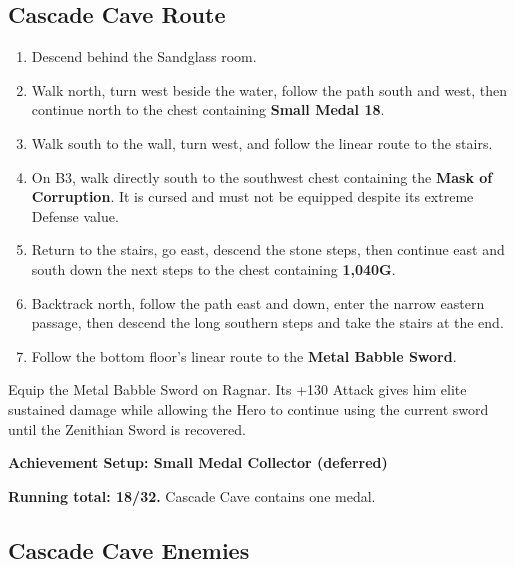 \documentclass[
  american,
  10pt,
  letterpaper,
  oneside,
  open=any]{scrreprt}
\providecommand{\tightlist}{%
  \setlength{\itemsep}{0pt}\setlength{\parskip}{0pt}}
\begin{document}
\subsection{Cascade Cave Route}\label{cascade-cave-route}

\begin{enumerate}
\def\labelenumi{\arabic{enumi}.}
\tightlist
\item
  Descend behind the Sandglass room.
\item
  Walk north, turn west beside the water, follow the path south and
  west, then continue north to the chest containing \textbf{Small Medal
  18}.
\item
  Walk south to the wall, turn west, and follow the linear route to the
  stairs.
\item
  On B3, walk directly south to the southwest chest containing the
  \textbf{Mask of Corruption}. It is cursed and must not be equipped
  despite its extreme Defense value.
\item
  Return to the stairs, go east, descend the stone steps, then continue
  east and south down the next steps to the chest containing
  \textbf{1,040G}.
\item
  Backtrack north, follow the path east and down, enter the narrow
  eastern passage, then descend the long southern steps and take the
  stairs at the end.
\item
  Follow the bottom floor's linear route to the \textbf{Metal Babble
  Sword}.
\end{enumerate}

Equip the Metal Babble Sword on Ragnar. Its +130 Attack gives him elite
sustained damage while allowing the Hero to continue using the current
sword until the Zenithian Sword is recovered.

\begin{achievementsetup}

\textbf{Achievement Setup: Small Medal Collector (deferred)}

\textbf{Running total: 18/32.} Cascade Cave contains one medal.

\end{achievementsetup}

\subsection{Cascade Cave Enemies}\label{cascade-cave-enemies}
\end{document}
